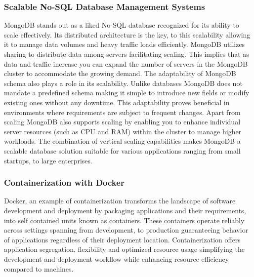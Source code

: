 \documentclass[a4paper,12pt]{article}  %
\begin{document}
\subsubsection{Scalable No-SQL Database Management Systems}
MongoDB stands out as a liked No-SQL database recognized for its ability to
scale effectively. Its distributed architecture is the key, to this scalability
allowing it to manage data volumes and heavy traffic loads efficiently. MongoDB
utilizes sharing to distribute data among servers facilitating scaling. This
implies that as data and traffic increase you can expand the number of servers
in the MongoDB cluster to accommodate the growing demand. The adaptability of
MongoDB schema also plays a role in its scalability. Unlike databases MongoDB
does not mandate a predefined schema making it simple to introduce new fields
or modify existing ones without any downtime. This adaptability proves
beneficial in environments where requirements are subject to frequent changes.
Apart from scaling MongoDB also supports scaling by enabling you to enhance
individual server resources (such as CPU and RAM) within the cluster to manage
higher workloads. The combination of vertical scaling capabilities makes
MongoDB a scalable database solution suitable for various applications ranging
from small startups, to large enterprises.\\

\subsubsection{Containerization with Docker }
Docker, an example of containerization transforms the landscape of software
development and deployment by packaging applications and their requirements,
into self contained units known as containers. These containers operate
reliably across settings spanning from development, to production guaranteeing
behavior of applications regardless of their deployment location.
Containerization offers application segregation, flexibility and optimized
resource usage simplifying the development and deployment workflow while
enhancing resource efficiency compared to machines.\\
\end{document}
